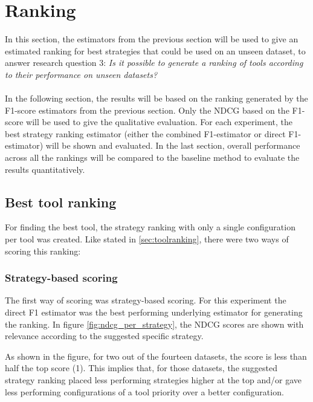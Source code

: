 \newpage
\section{Ranking}
In this section, the estimators from the previous section will be used to give an estimated ranking for best strategies that could be used on an unseen dataset, to answer research question 3: \textit{Is it possible to generate a ranking of tools according to their performance on unseen datasets?}
~\\~\\In the following section, the results will be based on the ranking generated by the F1-score estimators from the previous section. Only the NDCG based on the F1-score will be used to give the qualitative evaluation. For each experiment, the best strategy ranking estimator (either the combined F1-estimator or direct F1-estimator) will be shown and evaluated. In the last section, overall performance across all the rankings will be compared to the baseline method to evaluate the results quantitatively.

\subsection{Best tool ranking}
For finding the best tool, the strategy ranking with only a single configuration per tool was created. Like stated in \autoref{sec:toolranking}, there were two ways of scoring this ranking:

\subsubsection{Strategy-based scoring}
The first way of scoring was strategy-based scoring. For this experiment the direct F1 estimator was the best performing underlying estimator for generating the ranking. In figure \autoref{fig:ndcg_per_strategy}, the NDCG scores are shown with relevance according to the suggested specific strategy.

As shown in the figure, for two out of the fourteen datasets, the score is less than half the top score (1). This implies that, for those datasets, the suggested strategy ranking placed less performing strategies higher at the top and/or gave less performing configurations of a tool priority over a better configuration. 

